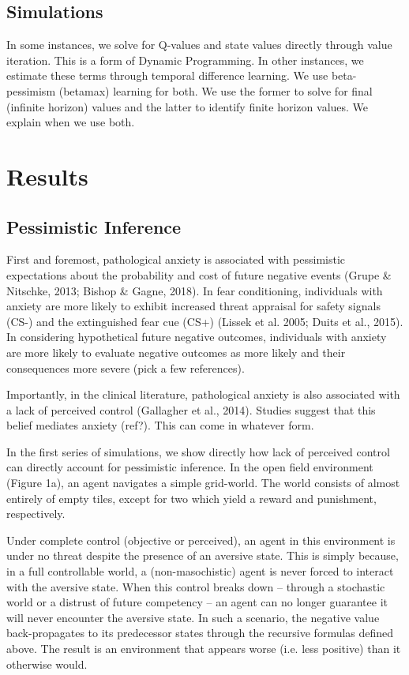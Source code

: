 \documentclass[11pt]{article} %
\begin{document}
\subsection{Simulations}

In some instances, we solve for Q-values and state values directly through value
iteration. This is a form of Dynamic Programming. In other instances, we estimate
these terms through temporal difference learning. We use beta-pessimism (betamax)
learning for both. We use the former to solve for final (infinite horizon) values
and the latter to identify finite horizon values. We explain when we use both.

\section{Results}

\subsection{Pessimistic Inference}

First and foremost, pathological anxiety is associated with pessimistic expectations
about the probability and cost of future negative events (Grupe \& Nitschke, 2013;
Bishop \& Gagne, 2018). In fear conditioning, individuals with anxiety are more
likely to exhibit increased threat appraisal for safety signals (CS-) and the
extinguished fear cue (CS+) (Lissek et al. 2005; Duits et al., 2015). In considering
hypothetical future negative outcomes, individuals with anxiety are more likely
to evaluate negative outcomes as more likely and their consequences more severe
(pick a few references).

Importantly, in the clinical literature, pathological anxiety is also associated
with a lack of perceived control (Gallagher et al., 2014). Studies suggest that
this belief mediates anxiety (ref?). This can come in whatever form.

In the first series of simulations, we show directly how lack of perceived control
can directly account for pessimistic inference. In the open field environment
(Figure 1a), an agent navigates a simple grid-world. The world consists of almost
entirely of empty tiles, except for two which yield a reward and punishment,
respectively.

Under complete control (objective or perceived), an agent in this environment is
under no threat despite the presence of an aversive state. This is simply because,
in a full controllable world, a (non-masochistic) agent is never forced to interact
with the aversive state. When this control breaks down -- through a stochastic
world or a distrust of future competency -- an agent can no longer guarantee it
will never encounter the aversive state. In such a scenario, the negative value
back-propagates to its predecessor states through the recursive formulas defined
above. The result is an environment that appears worse (i.e. less positive) than
it otherwise would.
\end{document}
